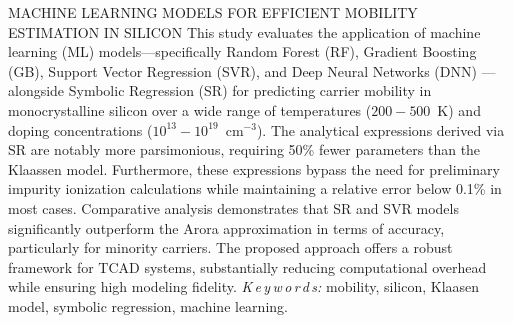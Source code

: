 \documentclass[fleqn,twoside,twocolumn,nofootinbib,showkeys]{revtex4} %
\begin{document}
\vspace*{-5mm}  {MACHINE LEARNING MODELS FOR EFFICIENT MOBILITY ESTIMATION IN SILICON}
{
This study evaluates the application of machine learning (ML) models—specifically
Random Forest (RF), Gradient Boosting (GB), Support Vector Regression (SVR),
and Deep Neural Networks (DNN) --- alongside Symbolic Regression (SR) for predicting carrier mobility in monocrystalline silicon
over a wide range of temperatures ($200-500$~K) and doping concentrations ($10^{13}-10^{19}$~cm$^{-3}$).
The analytical expressions derived via SR are notably more parsimonious,
requiring 50\% fewer parameters than the Klaassen model.
Furthermore, these expressions bypass the need for preliminary impurity ionization calculations
while maintaining a relative error below 0.1\% in most cases.
Comparative analysis demonstrates that SR and SVR models significantly outperform the Arora approximation in terms of accuracy,
particularly for minority carriers.
The proposed approach offers a robust framework for TCAD systems,
substantially reducing computational overhead while ensuring high modeling fidelity.
}
{\textit{K\,e\,y\,w\,o\,r\,d\,s:}
mobility, silicon, Klaasen model,
symbolic regression, machine learning.
}
\end{document}
